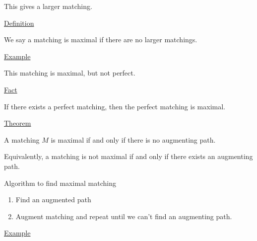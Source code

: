 \documentclass{article}
\begin{document}
This gives a larger matching.


\underline{Definition}

We say a matching is maximal if there are no larger matchings.

\underline{Example}

\begin{center}
\end{center}

This matching is maximal, but not perfect. 

\underline{Fact}

If there exists a perfect matching, then the perfect matching is maximal. 

\underline{Theorem}

A matching $M$ is maximal if and only if there is no augmenting path. 

Equivalently, a matching is not maximal if and only if there exists an augmenting path.


Algorithm to find maximal matching
\begin{enumerate}
    \item Find an augmented path
    \item Augment matching and repeat until we can't find an augmenting path.
\end{enumerate}

\underline{Example}
\end{document}
